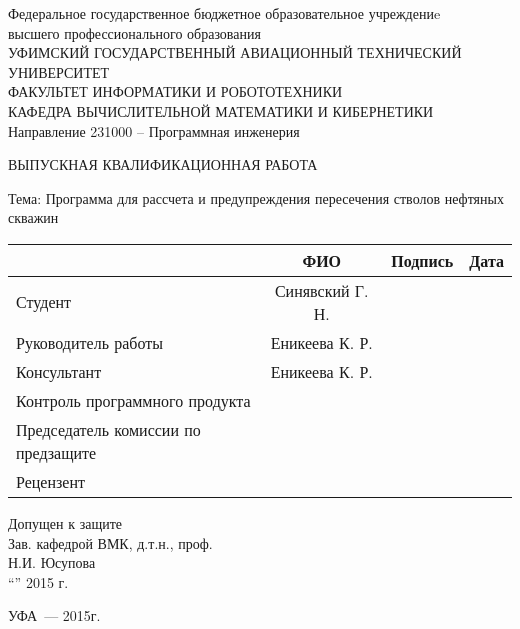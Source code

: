 \begin{titlepage}
\newpage

\begin{center}
Федеральное государственное бюджетное образовательное учреждениe\\
высшего профессионального образования \\
\vspace{0.5cm}
УФИМСКИЙ ГОСУДАРСТВЕННЫЙ АВИАЦИОННЫЙ ТЕХНИЧЕСКИЙ УНИВЕРСИТЕТ\\
\vspace{0.5cm}
ФАКУЛЬТЕТ  ИНФОРМАТИКИ  И  РОБОТОТЕХНИКИ \\
\vspace{0.5cm}
КАФЕДРА  ВЫЧИСЛИТЕЛЬНОЙ  МАТЕМАТИКИ  И  КИБЕРНЕТИКИ\\
\vspace{0.5cm}
Направление 231000 – Программная инженерия
\end{center}

\vspace{2em}

\begin{center}
\Large {ВЫПУСКНАЯ КВАЛИФИКАЦИОННАЯ РАБОТА}

\vspace{2.5em}

Тема: Программа для рассчета и предупреждения пересечения стволов нефтяных скважин
\end{center}

\vspace{3em}
\noindent
\begin{tabularx}{\textwidth}{|l|c|X|X|}
\hline
& ФИО & Подпись & Дата\\
\hline
Студент & Синявский Г. Н. &&\\
\hline
Руководитель работы & Еникеева К. Р. &&\\
\hline
Консультант & Еникеева К. Р. &&\\
\hline
Контроль программного продукта &&&\\
\hline
Председатель комиссии по предзащите &&&\\
\hline
Рецензент &&& \\
\hline
\end{tabularx}

\vspace{2em}
\center Допущен к защите\\
Зав. кафедрой  ВМК, д.т.н., проф.\\
\underline{\hspace{5cm}} Н.И. Юсупова\\
“\underline{\hspace{1cm}}”\underline{\hspace{5cm}} 2015 г.

\vspace{\fill}

\begin{center}
УФА~--- 2015г.
\end{center}

\end{titlepage}

